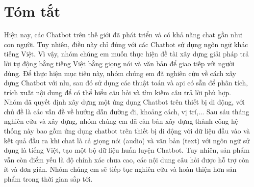 \chapter*{Tóm tắt}
\label{tomtat}
Hiện nay, các Chatbot trên thế giới đã phát triển và có khả năng chat gần như con người. Tuy nhiên, điều này chỉ đúng với các Chatbot sử dụng ngôn ngữ khác tiếng Việt. Vì vậy, nhóm chúng em muốn thực hiện đề tài xây dựng giải pháp trả lời tự động bằng tiếng Việt bằng giọng nói và văn bản để giao tiếp với người dùng. Để thực hiện mục tiêu này, nhóm chúng em đã nghiên cứu về cách xây dựng Chatbot với \ac{nlu}, sau đó sử dụng các thuật toán và \ac{api} có sẵn để phân tích, trích xuất nội dung để có thể hiểu câu hỏi và tìm kiếm câu trả lời phù hợp. Nhóm đã quyết định xây dựng một ứng dụng Chatbot trên thiết bị di động, với chủ đề là các vấn đề về hướng dẫn đường đi, khoảng cách, vị trí,... Sau sáu tháng nghiên cứu và xây dựng, nhóm chúng em đã căn bản xây dựng thành công hệ thống này bao gồm ứng dụng chatbot trên thiết bị di động với dữ liệu đầu vào và kết quả đầu ra khi chat là cả giọng nói (audio) và văn bản (text) với ngôn ngữ sử dụng là tiếng Việt, tạo một bộ dữ liệu huấn luyện Chatbot. Tuy nhiên, sản phẩm vẫn còn điểm yếu là độ chính xác chưa cao, các nội dung câu hỏi được hỗ trợ còn ít và đơn giản. Nhóm chúng em sẽ tiếp tục nghiên cứu và hoàn thiện hơn sản phẩm trong thời gian sắp tới. 

